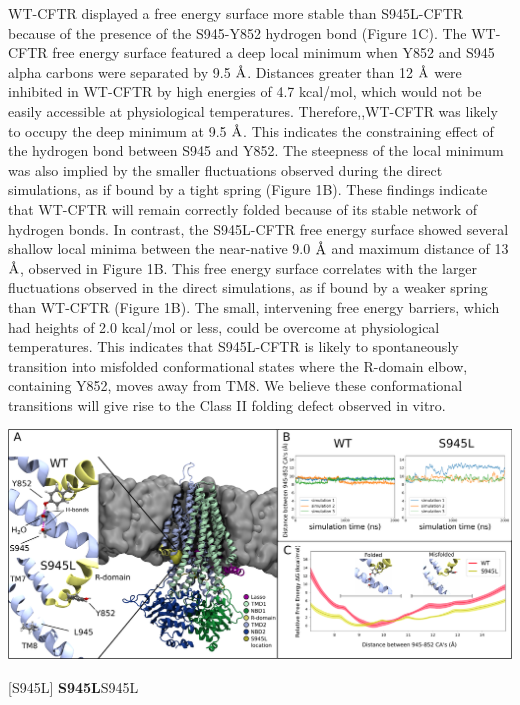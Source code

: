 WT-CFTR displayed a free energy surface more stable than S945L-CFTR because of the presence of the S945-Y852 hydrogen bond (Figure 1C). The WT-CFTR free energy surface featured a deep local minimum when Y852 and S945 alpha carbons were separated by 9.5 $\mbox{\textup{\AA}}$. Distances greater than 12 $\mbox{\textup{\AA}}$ were inhibited in WT-CFTR by high energies of 4.7 kcal/mol, which would not be easily accessible at physiological temperatures. Therefore,,WT-CFTR  was likely to occupy the deep minimum at 9.5 $\mbox{\textup{\AA}}$. This indicates the constraining effect of the hydrogen bond between S945 and Y852.  The steepness of the local minimum was also implied by the smaller fluctuations observed during the direct simulations, as if bound by a tight spring (Figure 1B). These findings indicate that WT-CFTR will remain correctly folded because of its stable network of hydrogen bonds. In contrast, the S945L-CFTR free energy surface showed several shallow local minima between the near-native 9.0 $\mbox{\textup{\AA}}$ and maximum distance of 13 $\mbox{\textup{\AA}}$, observed in Figure 1B. This free energy surface correlates with the larger fluctuations observed in the direct simulations, as if bound by a weaker spring than WT-CFTR (Figure 1B). The small, intervening free energy barriers, which had heights of 2.0 kcal/mol or less, could be overcome at physiological temperatures. This indicates that S945L-CFTR is likely to spontaneously transition into misfolded conformational states where the R-domain elbow, containing Y852, moves away from TM8. We believe these conformational transitions will give rise to the Class II folding defect observed in vitro. 

\begin{center}
	\includegraphics[width=\textwidth]{figures/S945L/Figure1_MD_03082022.pdf}
\end{center}
	\captionsetup{singlelinecheck = false, justification=raggedright}
\begingroup
{}[S945L] {\textbf{S945L}}{S945L}
\label{S945L_MD_1}
\endgroup


